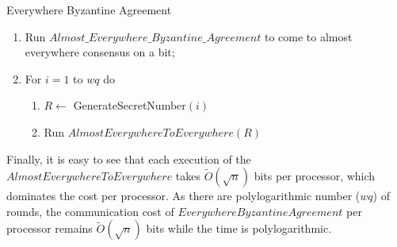 \documentclass{sig-alternate}
\begin{document}
\begin{algorithm}
\caption{Everywhere Byzantine Agreement}

\begin{enumerate}
\item
Run $Almost\_Everywhere\_Byzantine\_ Agreement$  to come to almost everywhere consensus on a bit;
\item
For $i=1$ to  $wq$ do
\begin{enumerate}
\item
$R \leftarrow $ GenerateSecretNumber$(i)$
\item
Run $AlmostEverywhereToEverywhere(R)$
\end{enumerate}
\end{enumerate}
\end{algorithm}

Finally,  it is easy to see that each execution of the $AlmostEverywhereToEverywhere$ takes $\tilde{O}(\sqrt{n})$ bits per
processor, which dominates the cost per processor. As there are polylogarithmic number ($wq$) of rounds, the communication cost  of $Everywhere Byzantine Agreement$ per processor remains  $\tilde{O}(\sqrt{n})$ bits while the time is polylogarithmic. 
\end{document}

